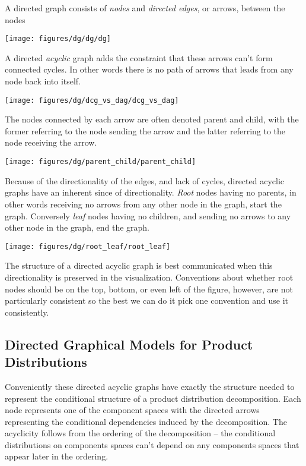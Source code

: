 \documentclass[]{article}
\begin{document}
A directed graph consists of \emph{nodes} and \emph{directed edges}, or
arrows, between the nodes

\texttt{[image: figures/dg/dg/dg]}

A directed \emph{acyclic} graph adds the constraint that these arrows
can't form connected cycles. In other words there is no path of arrows
that leads from any node back into itself.

\texttt{[image: figures/dg/dcg\_vs\_dag/dcg\_vs\_dag]}

The nodes connected by each arrow are often denoted parent and child,
with the former referring to the node sending the arrow and the latter
referring to the node receiving the arrow.

\texttt{[image: figures/dg/parent\_child/parent\_child]}

Because of the directionality of the edges, and lack of cycles, directed
acyclic graphs have an inherent since of directionality. \emph{Root}
nodes having no parents, in other words receiving no arrows from any
other node in the graph, start the graph. Conversely \emph{leaf} nodes
having no children, and sending no arrows to any other node in the
graph, end the graph.

\texttt{[image: figures/dg/root\_leaf/root\_leaf]}

The structure of a directed acyclic graph is best communicated when this
directionality is preserved in the visualization. Conventions about
whether root nodes should be on the top, bottom, or even left of the
figure, however, are not particularly consistent so the best we can do
it pick one convention and use it consistently.

\hypertarget{directed-graphical-models-for-product-distributions}{%
\subsection{Directed Graphical Models for Product
Distributions}\label{directed-graphical-models-for-product-distributions}}

Conveniently these directed acyclic graphs have exactly the structure
needed to represent the conditional structure of a product distribution
decomposition. Each node represents one of the component spaces with the
directed arrows representing the conditional dependencies induced by the
decomposition. The acyclicity follows from the ordering of the
decomposition -- the conditional distributions on components spaces
can't depend on any components spaces that appear later in the ordering.
\end{document}
